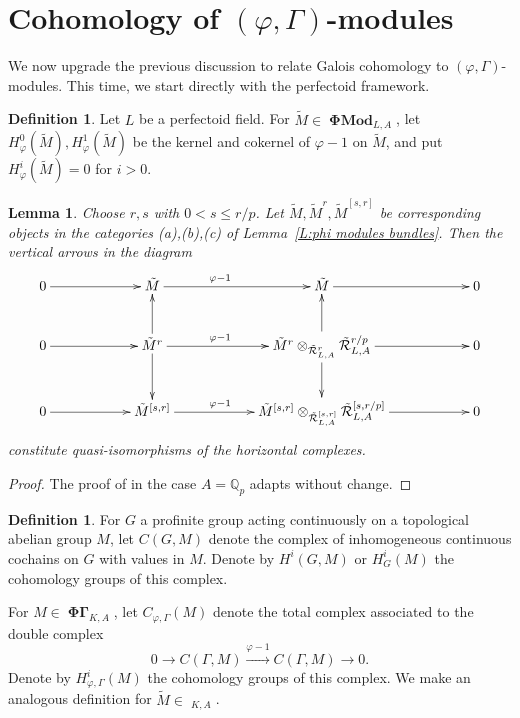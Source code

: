 \documentclass[12pt]{amsart}
\newtheorem{lemma}[theorem]{Lemma}
\theoremstyle{definition}
\newtheorem{defn}[theorem]{Definition}
\numberwithin{equation}{theorem}
\newcommand{\QQ}{\mathbb{Q}}
\newcommand{\calR}{\mathcal{R}}
\DeclareMathOperator{\PhiGamma}{\mathbf{\Phi \Gamma}}
\DeclareMathOperator{\PhiGammatilde}{\widetilde{\mathbf{\Phi \Gamma}}}
\DeclareMathOperator{\PhiMod}{\mathbf{\Phi Mod}}
\begin{document}
\section{Cohomology of $(\varphi, \Gamma)$-modules}

We now upgrade the previous discussion to relate Galois cohomology to $(\varphi, \Gamma)$-modules. This time, we start directly with the perfectoid framework.
\begin{defn}
Let $L$ be a perfectoid field.
For $\tilde{M} \in \PhiMod_{L,A}$, let $H^0_{\varphi}(\tilde{M}), H^1_{\varphi}(\tilde{M})$ be the kernel and cokernel of $\varphi-1$ on $\tilde{M}$, and put $H^i_{\varphi}(\tilde{M}) = 0$ for $i>0$.
\end{defn}

\begin{lemma} \label{L:truncate cohomology}
Choose $r,s$ with $0 < s \leq r/p$. Let $\tilde{M}, \tilde{M}^r, \tilde{M}^{[s,r]}$
be corresponding objects in the categories (a),(b),(c) of Lemma~\ref{L:phi modules bundles}.
Then the vertical arrows in the diagram
\[
\xymatrix@C=2cm{
0 \ar[r] & \tilde{M} \ar^(.4){\varphi-1}[r] & \tilde{M} \ar[r] &  0 \\
0 \ar[r] & \tilde{M}^r \ar^(.4){\varphi-1}[r] \ar[u] \ar[d] & \tilde{M}^r \otimes_{\tilde{\calR}^r_{L,A}} \tilde{\calR}^{r/p}_{L,A} \ar[r] \ar[d] \ar[u] & 0 \\
0 \ar[r] & \tilde{M}^{[s,r]} \ar^(.4){\varphi-1}[r] & \tilde{M}^{[s,r]} \otimes_{\tilde{\calR}^{[s,r]}_{L,A}} \tilde{\calR}^{[s,r/p]}_{L,A} \ar[r] & 0
}
\]
constitute quasi-isomorphisms of the horizontal complexes.
\end{lemma}
\begin{proof}
The proof of \cite[Proposition~6.3.19]{kedlaya-liu1} in the case $A = \QQ_p$ adapts without change.
\end{proof}

\begin{defn}
For $G$ a profinite group acting continuously on a topological abelian group $M$,
let $C(G,M)$ denote the complex of inhomogeneous continuous cochains on $G$ with values in $M$. Denote by $H^i(G,M)$ or $H^i_G(M)$ the cohomology groups of this complex.

For $M \in \PhiGamma_{K,A}$, let $C_{\varphi, \Gamma}(M)$ denote the total complex associated to the double complex
\[
0 \to C(\Gamma, M) \stackrel{\varphi-1}{\to} C(\Gamma,M) \to 0.
\]
Denote by $H^i_{\varphi, \Gamma}(M)$ the cohomology groups of this complex.
We make an analogous definition for $\tilde{M} \in \PhiGammatilde_{K,A}$.
\end{defn}
\end{document}
